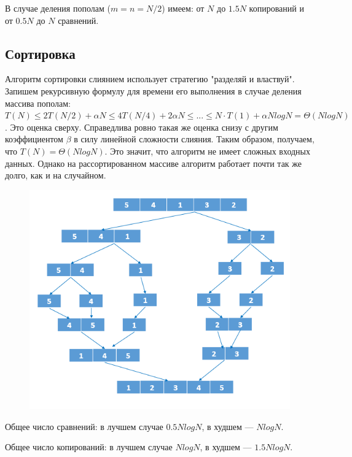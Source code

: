 \documentclass[14pt]{extarticle}
\begin{document}
В случае деления пополам ($m=n=N/2$) имеем: от $N$ до $ 1.5 N $ копирований и от $0.5 N$ до $N$ сравнений.

\subsection*{Сортировка}
Алгоритм сортировки слиянием использует стратегию "разделяй и властвуй". Запишем рекурсивную формулу для времени его выполнения в случае деления массива пополам: $ T(N) \le 2T(N/2) + \alpha N \le 4T(N/4) + 2 \alpha N \le ... \le N \cdot T(1) + \alpha N log N = \Theta (N log N)$. Это оценка сверху. Справедлива ровно такая же оценка снизу с другим коэффициентом $ \beta $ в силу линейной сложности слияния. Таким образом, получаем, что $ T(N) = \Theta(N log N) $. Это значит, что алгоритм не имеет сложных входных данных. Однако на рассортированном массиве алгоритм работает почти так же долго, как и на случайном.

\begin{figure}[H]
	\centering
	\includegraphics[scale=1]{mergesort}
\end{figure}

Общее число сравнений: в лучшем случае $ 0.5 N log N $, в худшем --- $ N log N $.

Общее число копирований: в лучшем случае $ N log N $, в худшем --- $ 1.5 N log N $.
\end{document}
